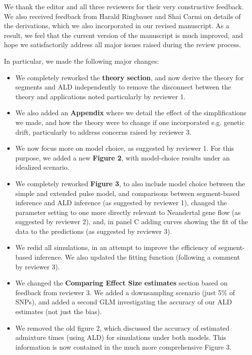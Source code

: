 \documentclass[11pt]{article}
\begin{document}
We thank the editor and all three reviewers for their very constructive feedback. We also received feedback from Harald Ringbauer and Shai Carmi on details of the derivations, which we also incorporated in our revised manuscript. As a result, we feel that the current version of the manuscript is much improved, and hope we satisfactorily address all major issues raised during the review process.

In particular, we made the following major changes:
\begin{itemize}
    \item We completely reworked the \textbf{theory section}, and now derive the theory for segments and ALD independently to remove the disconnect between the theory and applications noted particularly by reviewer 1. 
    \item We also added an \textbf{Appendix} where we detail the effect of the simplifications we made, and how the theory were to change if one incorporated e.g. genetic drift, particularly to address concerns raised by reviewer 3.
    \item We now focus more on model choice, as suggested by reviewer 1. For this purpose, we added a new \textbf{Figure 2}, with model-choice results under an idealized scenario. 
    \item We completely reworked \textbf{Figure 3}, to also include model choice between the simple and extended pulse model, and comparisons between segment-based inference and ALD inference (as suggested by reviewer 1), changed the parameter setting to one more directly relevant to Neandertal gene flow (as suggested by reviewer 2), and, in panel C adding curves showing the fit of the data to the predictions (as suggested by reviewer 3).
    \item We redid all simulations, in an attempt to improve the efficiency of segment-based inference. We also updated the fitting function (following a comment by reviewer 3).
    \item We changed the \textbf{Comparing Effect Size estimates} section based on feedback from reviewer 3. We added a downsampling scenario (just 5\% of SNPs), and added a second GLM investigating the accuracy of our ALD estimates (not just the bias). 
    \item We removed the old figure 2, which discussed the accuracy of estimated admixture times (using ALD) for simulations under both models. This information is now contained in the much more comprehensive Figure 3. 
\end{itemize}
\end{document}
